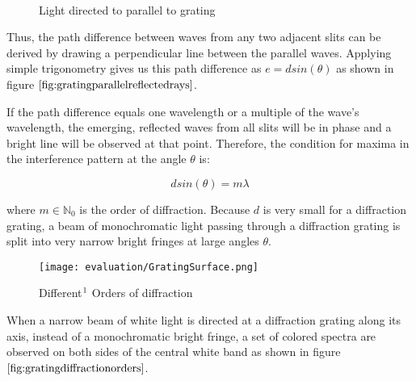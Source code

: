 \begin{figure}[H]
  \centering
~  

\caption[Idealized Diffraction Grating]{Light directed to parallel to grating}
\label{fig:lighthitsgrating}
\end{figure}


Thus, the path difference between waves from any two adjacent slits can be derived by drawing a perpendicular line between the parallel waves. Applying simple trigonometry gives us this path difference as $e = d sin(\theta)$ as shown in figure $\ref{fig:gratingparallelreflectedrays}$. 


If the path difference equals one wavelength or a multiple of the wave's wavelength, the emerging, reflected waves from all slits will be in phase and a bright line will be observed at that point. Therefore, the condition for maxima in the interference pattern at the angle $\theta$ is: 

\begin{equation}
 d sin(\theta) = m \lambda 
\label{eq:simplegratingequation}
\end{equation}

where $m \in \mathds{N}_0$ is the order of diffraction. Because $d$ is very small for a diffraction grating, a beam of monochromatic light passing through a diffraction grating is split into very narrow bright fringes at large angles $\theta$.

\begin{figure}[H]
  \centering
  \texttt{[image: evaluation/GratingSurface.png]}
  \caption[Diffraction Orders]{Different$\footnotemark$ Orders of diffraction}
\label{fig:gratingdiffractionorders}
\end{figure}

When a narrow beam of white light is directed at a diffraction grating along its axis, instead of a monochromatic bright fringe, a set of colored spectra are observed on both sides of the central white band as shown in figure $\ref{fig:gratingdiffractionorders}$.

